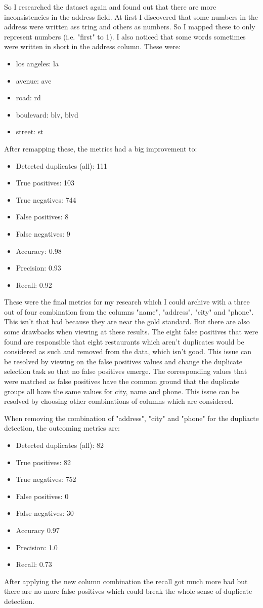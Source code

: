 \documentclass[conference]{IEEEtran}
\begin{document}
So I researched the dataset again and found out that there are more inconsistencies in the address field. At first I discovered that some numbers in the address were written ass tring and others as numbers. So I mapped these to only represent numbers (i.e. "first" to 1). I also noticed that some words sometimes were written in short in the address column. These were: 
\begin{itemize}
	\item los angeles: la
	\item avenue: ave
	\item road: rd
	\item boulevard: blv, blvd
	\item street: st
\end{itemize}
After remapping these, the metrics had a big improvement to: 
\begin{itemize}
	\item Detected duplicates (all): 111
	\item True positives: 103
	\item True negatives: 744
	\item False positives: 8
	\item False negatives: 9
	\item Accuracy: 0.98
	\item Precision: 0.93
	\item Recall: 0.92
\end{itemize}
These were the final metrics for my research which I could archive with a three out of four combination from the columns "name", "address", "city" and "phone". This isn't that bad because they are near the gold standard. But there are also some drawbacks when viewing at these results. The eight false positives that were found are responsible that eight restaurants which aren't duplicates would be considered as such and removed from the data, which isn't good. This issue can be resolved by viewing on the false positives values and change the duplicate selection task so that no false positives emerge. The corresponding values that were matched as false positives have the common ground that the duplicate groups all have the same values for city, name and phone. This issue can be resolved by choosing other combinations of columns which are considered.

When removing the combination of "address", "city" and "phone" for the dupliacte detection, the outcoming metrics are: 
\begin{itemize}
	\item Detected duplicates (all): 82
	\item True positives: 82
	\item True negatives: 752
	\item False positives: 0
	\item False negatives: 30
	\item Accuracy 0.97
	\item Precision: 1.0
	\item Recall: 0.73
\end{itemize}
After applying the new column combination the recall got much more bad but there are no more false positives which could break the whole sense of duplicate detection. 
\end{document}
